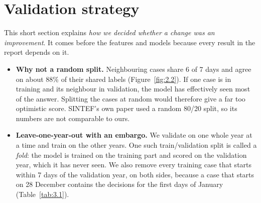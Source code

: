 \section{Validation strategy}\label{sec:3}

\begin{disposition}
This short section explains \emph{how we decided whether a change was an improvement}. It comes before the features and models because every result in the report depends on it.

\begin{itemize}
\tightlist
\item
  \textbf{Why not a random split.} Neighbouring cases share 6 of 7 days and agree on about 88\% of their shared labels (Figure~\ref{fig:2.2}). If one case is in training and its neighbour in validation, the model has effectively seen most of the answer. Splitting the cases at random would therefore give a far too optimistic score. SINTEF's own paper used a random 80/20 split, so its numbers are not comparable to ours.
\item
  \textbf{Leave-one-year-out with an embargo.} We validate on one whole year at a time and train on the other years. One such train/validation split is called a \emph{fold}: the model is trained on the training part and scored on the validation year, which it has never seen. We also remove every training case that starts within 7 days of the validation year, on both sides, because a case that starts on 28 December contains the decisions for the first days of January (Table~\ref{tab:3.1}).
\end{itemize}
\end{disposition}



\begin{table}[H]
  \centering\small
  \caption{The four folds and the locked holdout}
  \label{tab:3.1}
\end{table}

